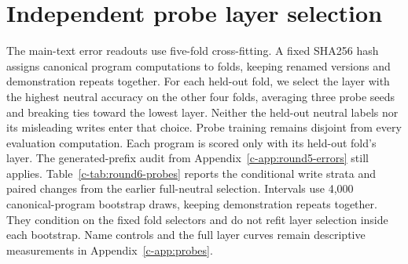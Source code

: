 \section{Independent probe layer selection}
\label{c-app:round6-probes}
The main-text error readouts use five-fold cross-fitting. A fixed SHA256 hash assigns canonical program computations to folds, keeping renamed versions and demonstration repeats together. For each held-out fold, we select the layer with the highest neutral accuracy on the other four folds, averaging three probe seeds and breaking ties toward the lowest layer. Neither the held-out neutral labels nor its misleading writes enter that choice. Probe training remains disjoint from every evaluation computation.
Each program is scored only with its held-out fold's layer. The generated-prefix audit from Appendix~\ref{c-app:round5-errors} still applies. Table~\ref{c-tab:round6-probes} reports the conditional write strata and paired changes from the earlier full-neutral selection. Intervals use 4,000 canonical-program bootstrap draws, keeping demonstration repeats together. They condition on the fixed fold selectors and do not refit layer selection inside each bootstrap. Name controls and the full layer curves remain descriptive measurements in Appendix~\ref{c-app:probes}.
\begin{table}[t]
\centering\small
{}
\ifdim\wd\roundsixbox>\textwidth\resizebox{\textwidth}{!}{\usebox{\roundsixbox}}\else\usebox{\roundsixbox}\fi
\caption{True-digit readouts with independent layer selection. Changes compare the same observed writes with the earlier full-neutral layer choice. A dash denotes an empty stratum. These readouts establish decodability, not causal use.}
\label{c-tab:round6-probes}
\end{table}
